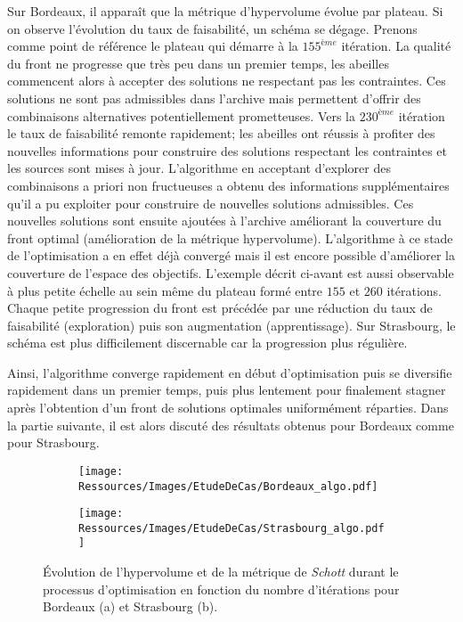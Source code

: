Sur Bordeaux, il apparaît que la métrique d’hypervolume évolue par plateau. Si on observe
l’évolution du taux de faisabilité, un schéma se dégage. Prenons comme point de référence
le plateau qui démarre à la $155^{ème}$ itération. La qualité du front ne progresse que
très peu dans un premier temps, les abeilles commencent alors à accepter des solutions ne
respectant pas les contraintes. Ces solutions ne sont pas admissibles dans l’archive mais
permettent d’offrir des combinaisons alternatives potentiellement prometteuses. Vers la
$230^{ème}$ itération le taux de faisabilité remonte rapidement; les abeilles ont réussis à
profiter des nouvelles informations pour construire des solutions respectant les
contraintes et les sources sont mises à jour. L’algorithme en acceptant d’explorer des
combinaisons a priori non fructueuses a obtenu des informations supplémentaires
qu’il a pu exploiter pour construire de nouvelles solutions admissibles. Ces nouvelles
solutions sont ensuite ajoutées à l’archive améliorant la couverture du front optimal
(amélioration de la métrique hypervolume). L’algorithme à ce stade de l’optimisation a en
effet déjà convergé mais il est encore possible d’améliorer la couverture de l’espace des
objectifs.
L’exemple décrit ci-avant est aussi observable à plus petite échelle au sein même du plateau
formé entre $155$ et $260$ itérations. Chaque petite progression du front est précédée par
une réduction du taux de faisabilité (exploration) puis son augmentation (apprentissage).
Sur Strasbourg, le schéma est plus difficilement discernable car la progression plus régulière.

Ainsi, l’algorithme converge rapidement en début d’optimisation puis se diversifie
rapidement dans un premier temps, puis plus lentement pour finalement stagner après
l’obtention d’un front de solutions optimales uniformément réparties. Dans la partie
suivante, il est alors discuté des résultats obtenus pour Bordeaux comme pour
Strasbourg.

\begin{figure}
    \centering
    \begin{subfigure}[b]{0.48\textwidth}
        \centering
        \texttt{[image: Ressources/Images/EtudeDeCas/Bordeaux\_algo.pdf]}
        \caption{}
        \label{fig:hypervolume_schott_bor}
    \end{subfigure}
    \quad
    \begin{subfigure}[b]{0.48\textwidth}
        \centering
        \texttt{[image: Ressources/Images/EtudeDeCas/Strasbourg\_algo.pdf]}
        \caption{}
        \label{fig:hypervolume_schottstras}
    \end{subfigure}
    \caption[Évolution de la convergence et de la diversification de l’optimisation]
             {Évolution de l’hypervolume et de la métrique de \textit{Schott}
              durant le processus d’optimisation en fonction du nombre d’itérations pour
              Bordeaux (a) et Strasbourg (b).}
    \label{fig:hypervolume_schott_front}
\end{figure}


